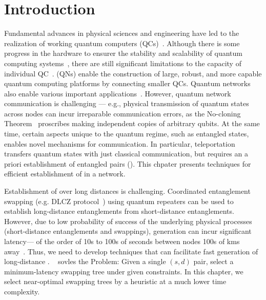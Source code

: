 \section{Introduction}
\label{sec:swapping_intro}

Fundamental advances in physical sciences and engineering have led to the realization of working quantum computers (QCs)~\cite{google-nature-19,ibm-quantum-roadmap}.
Although there is some progress in the hardware to ensurer the stability and scalability of quantum computing systems~\cite{tianyi-laser,tianyi-photon},
there are still significant limitations 
to the capacity of individual QC~\cite{Caleffi18}.   (QNs) enable the construction of large, robust, and more capable quantum computing platforms by connecting smaller QCs. Quantum networks~\cite{qn}
also enable various important applications~\cite{Eldredge_2018,qkd,atomic,secure,byzantine}.
However, quantum network communication is challenging --- e.g., physical transmission of quantum states across nodes can incur irreparable communication errors, as 
the No-cloning Theorem~\cite{Dieks-nocloning} proscribes making 
independent copies of arbitrary qubits. 
At the same time, certain aspects unique to the quantum regime, such as entangled states, enables 
novel mechanisms for communication.
In particular, teleportation~\cite{Bennett+:93} transfers quantum states with just classical
communication, but requires an a priori establishment of entangled pairs (\epss).
This chpater presents techniques for efficient establishment of \epss in a network.

Establishment of \epss over long distances is challenging. 
Coordinated entanglement swapping (e.g. DLCZ protocol~\cite{dlcz}) using quantum repeaters 
can be used to establish long-distance entanglements from short-distance entanglements.
However, due to low probability of success of the underlying physical processes
(short-distance entanglements and swappings),  \eps generation can incur significant latency---
of the order of 10s to 100s of seconds between nodes 100s of kms away~\cite{gisin}.
Thus, we need to develop techniques that can facilitate fast generation of long-distance \epss. 
~\cite{swapping-tqe-22} sovles the \spp Problem: Given a single $(s,d)$ pair, select a minimum-latency swapping tree under given constraints. 
In this chapter, we select near-optimal swapping trees by a heuristic at a much lower time complexity.

